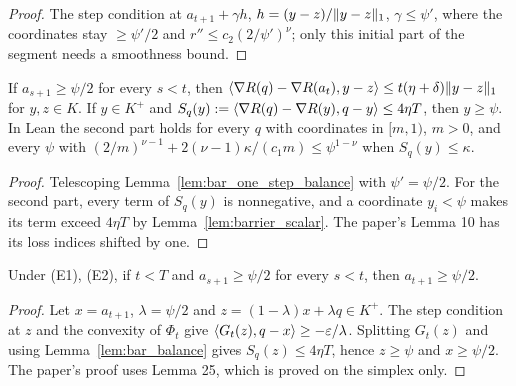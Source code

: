 \begin{proof}
  \leanok
  The step condition at $a_{t+1} + \gamma h$, $h = (y - z)/\lVert y - z \rVert_1$, $\gamma \le \psi'$,
  where the coordinates stay $\ge \psi'/2$ and $r'' \le c_2(2/\psi')^\nu$; only this initial part
  of the segment needs a smoothness bound.
\end{proof}

\begin{lemma}
  \label{lem:bar_balance}
  \leanok
  If $a_{s+1} \ge \psi/2$ for every $s < t$, then $\langle \nabla R(q) - \nabla R(a_t), y - z \rangle \le
  t(\eta + \delta)\lVert y - z \rVert_1$ for $y, z \in K$. If $y \in K^+$ and
  $S_q(y) := \langle \nabla R(q) - \nabla R(y), q - y \rangle \le 4\eta T$, then $y \ge \psi$. In Lean the
  second part holds for every $q$ with coordinates in $[m, 1)$, $m > 0$, and every $\psi$ with
  $(2/m)^{\nu-1} + 2(\nu - 1)\kappa/(c_1 m) \le \psi^{1-\nu}$ when $S_q(y) \le \kappa$.
\end{lemma}

\begin{proof}
  \leanok
  Telescoping Lemma~\ref{lem:bar_one_step_balance} with $\psi' = \psi/2$. For the second part,
  every term of $S_q(y)$ is nonnegative, and a coordinate $y_i < \psi$ makes its term exceed
  $4\eta T$ by Lemma~\ref{lem:barrier_scalar}. The paper's Lemma 10 has its loss indices shifted by
  one.
\end{proof}

\begin{lemma}
  \label{lem:bar_pull_to_start}
  \leanok
  Under (E1), (E2), if $t < T$ and $a_{s+1} \ge \psi/2$ for every $s < t$, then
  $a_{t+1} \ge \psi/2$.
\end{lemma}

\begin{proof}
  \leanok
  Let $x = a_{t+1}$, $\lambda = \psi/2$ and $z = (1 - \lambda)x + \lambda q \in K^+$. The step
  condition at $z$ and the convexity of $\Phi_t$ give $\langle G_t(z), q - x \rangle \ge -\varepsilon/\lambda$.
  Splitting $G_t(z)$ and using Lemma~\ref{lem:bar_balance} gives $S_q(z) \le 4\eta T$, hence
  $z \ge \psi$ and $x \ge \psi/2$. The paper's proof uses Lemma 25, which is proved on the simplex
  only.
\end{proof}

